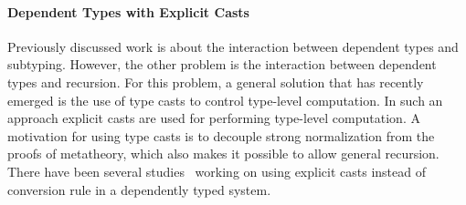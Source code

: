 \paragraph{Dependent Types with Explicit Casts} Previously 
discussed work is about the interaction between dependent types and 
subtyping. However, the other problem is the
interaction between dependent types and recursion. For this
problem, a general solution that has recently emerged is the use 
of type casts to control type-level computation. In such an approach explicit casts
are used for performing type-level computation. A motivation for
using type casts is to decouple strong normalization from the
proofs of metatheory, which also makes it possible to allow general
recursion. There have been several studies~\cite{guru,sjoberg:msfp12,
  kimmel:plpv, zombie:popl15, fc:kind, Doorn:2013hq,isotype} working
on using explicit casts instead of conversion rule in a dependently
typed system. 
